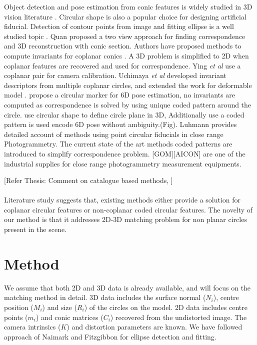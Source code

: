 \documentclass{bmvc2k}
\def\etal{\emph{et al}\bmvaOneDot}
\begin{document}
Object detection and pose estimation from conic features is widely studied in 3D vision literature  \cite{dhome_spatial_1990}\cite{safaee-rad_three-dimensional_1992} \cite{werghi_pose_1996} \cite{quan_invariant_1995}. Circular shape is also a popular choice for designing artificial fiducial. Detection of contour points from image and fitting ellipse is a well studied topic \cite{fitzgibbon_direct_1999}. 
Quan \cite{quan_conic_1996} proposed a two view approach for finding correspondence and 3D reconstruction with conic section. Authors have proposed methods to compute invariants for coplanar conics \cite{forsyth_91} \cite{Ferri_1993}.  
A 3D problem is simplified to 2D when coplanar features are recovered and used for correspondence.  
Ying \etal \cite{ying_camera_2007} use a coplanar pair for camera calibration. 
Uchimaya \etal \cite{uchiyama_random_2011} developed invariant descriptors from multiple coplanar circles, and extended the work for deformable model \cite{uchiyama_deformable_2011}.
\cite{lo_pez_de_ipin_a_trip:_2002} \cite{naimark_circular_2002} \cite{pagani_circular_2011} propose a circular marker for 6D pose estimation, no invariants are computed as correspondence is solved by using unique coded pattern around the circle. 
\cite{lo_pez_de_ipin_a_trip:_2002}\cite{pagani_circular_2011} use circular shape to define circle plane in 3D, Additionally use a coded pattern is used encode 6D pose without ambiguity.(Fig). 
Luhmann \cite{luhmann_close_2006} provides detailed account of methods using point circular fiducials in close range Photogrammetry. The current state of the art methods coded patterns are introduced to simplify correspondence problem.
[GOM][AICON] are one of the industrial supplies for close range photogrammetry measurement equipments. 

[Refer Thesis: Comment on catalogue based methods, ]
\paragraph{}
Literature study suggests that, existing methods either provide a solution for coplanar circular features or non-coplanar  coded circular features. The novelty of our method is that it addresses 2D-3D matching problem for non planar circles present in the scene. 

\section{Method}
We assume that both 2D and 3D data is already available, and will focus on the matching method in detail. 
3D data includes the surface normal ($N_i$), centre position ($M_i$) and size ($R_i$) of the circles on the model. 
2D data includes centre points ($m_i$) and conic matrices ($C_i$) recovered from the undistorted image. The camera intrinsics ($K$) and distortion parameters are known. We have followed approach of Naimark \cite{naimark_circular_2002} and Fitzgibbon \cite{fitzgibbon_direct_1999} for ellipse detection and fitting.  
\end{document}
